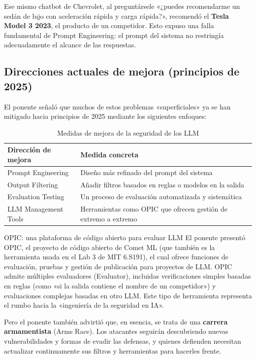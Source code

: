 \documentclass[a4paper]{article}
\begin{document}
Ese mismo chatbot de Chevrolet, al preguntársele «¿puedes recomendarme un sedán de lujo con aceleración rápida y carga rápida?», recomendó el \textbf{Tesla Model 3 2023}, el producto de un competidor. Esto expuso una falla fundamental de Prompt Engineering: el prompt del sistema no restringía adecuadamente el alcance de las respuestas.

\subsection{Direcciones actuales de mejora (principios de 2025)}

El ponente señaló que muchos de estos problemas «superficiales» ya se han mitigado hacia principios de 2025 mediante los siguientes enfoques:

\begin{table}[H]
\centering
\caption{Medidas de mejora de la seguridad de los LLM}
\begin{tabular}{@{}ll@{}}
\toprule
\textbf{Dirección de mejora} & \textbf{Medida concreta} \\
\midrule
Prompt Engineering & Diseño más refinado del prompt del sistema \\
Output Filtering & Añadir filtros basados en reglas o modelos en la salida \\
Evaluation Testing & Un proceso de evaluación automatizada y sistemática \\
LLM Management Tools & Herramientas como OPIC que ofrecen gestión de extremo a extremo \\
\bottomrule
\end{tabular}
\end{table}

\begin{knowledgebox}{OPIC: una plataforma de código abierto para evaluar LLM}
El ponente presentó OPIC, el proyecto de código abierto de Comet ML (que también es la herramienta usada en el Lab 3 de MIT 6.S191), el cual ofrece funciones de evaluación, pruebas y gestión de publicación para proyectos de LLM. OPIC admite múltiples evaluadores (Evaluator), incluidas verificaciones simples basadas en reglas (como «si la salida contiene el nombre de un competidor») y evaluaciones complejas basadas en otro LLM. Este tipo de herramienta representa el rumbo hacia la «ingeniería de la seguridad en IA».
\end{knowledgebox}

Pero el ponente también advirtió que, en esencia, se trata de una \textbf{carrera armamentista} (Arms Race). Los atacantes seguirán descubriendo nuevas vulnerabilidades y formas de evadir las defensas, y quienes defienden necesitan actualizar continuamente sus filtros y herramientas para hacerles frente.
\end{document}
